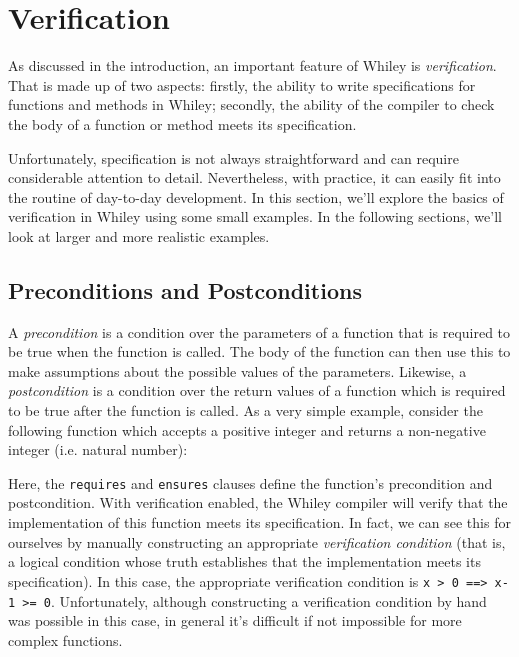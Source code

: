 \newpage
\section{Verification}

As discussed in the introduction, an important feature of Whiley is
{\em verification}.  That is made up of two aspects: firstly, the
ability to write specifications for functions and methods in Whiley;
secondly, the ability of the compiler to check the body of a function
or method meets its specification.

Unfortunately, specification is not always straightforward and
can require considerable attention to detail.  Nevertheless, with
practice, it can easily fit into the routine of day-to-day
development.  In this section, we'll explore the basics of
verification in Whiley using some small examples.  In the following
sections, we'll look at larger and more realistic examples.

\subsection{Preconditions and Postconditions}
A {\em precondition} is a condition over the parameters of a function
that is required to be true when the function is called.  The body of
the function can then use this to make assumptions about the possible
values of the parameters.  Likewise, a {\em postcondition} is a
condition over the return values of a function which is required to be
true after the function is called.  As a very simple example, consider
the following function which accepts a positive integer and returns a
non-negative integer (i.e. natural number):



Here, the \lstinline{requires} and \lstinline{ensures} clauses define
the function's precondition and postcondition.  With verification
enabled, the Whiley compiler will verify that the
implementation of this function meets its specification.  In fact, we
can see this for ourselves by manually constructing an appropriate
{\em verification condition} (that is, a logical condition whose truth
establishes that the implementation meets its specification).  In this
case, the appropriate verification condition is
 \lstinline{x > 0 ==> x-1 >= 0}.  Unfortunately, although constructing a verification
condition by hand was possible in this case, in general it's difficult
if not impossible for more complex functions.

